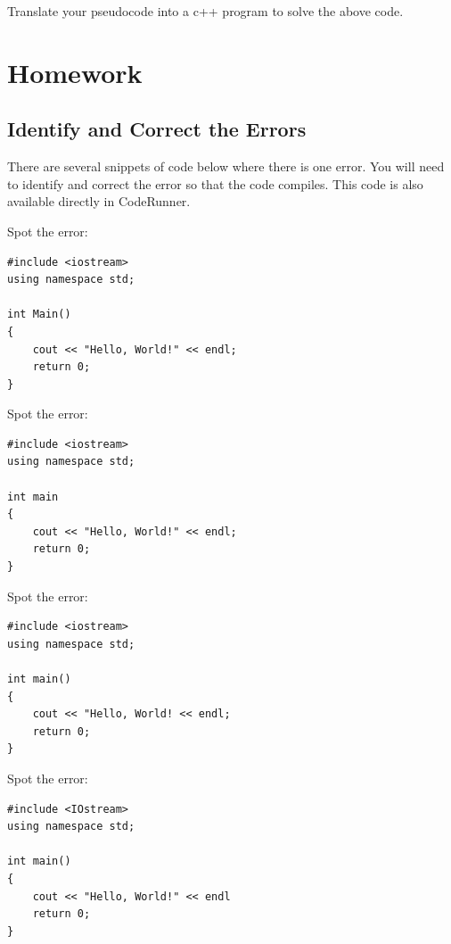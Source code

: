 \vspace{7cm}

\begin{multipart}
    Translate your pseudocode into a c++ program to solve the above code. 
\end{multipart}

\section{Homework}
\subsection{Identify and Correct the Errors}
There are several snippets of code below where there is one error. You will need to identify and correct the error so that the code compiles. This code is also available directly in CodeRunner. 

\begin{multipart}
Spot the error:

    \begin{verbatim}
#include <iostream> 
using namespace std;

int Main()
{
    cout << "Hello, World!" << endl;
    return 0; 
}
    \end{verbatim}
\end{multipart}

\begin{multipart}
Spot the error:

    \begin{verbatim}
#include <iostream> 
using namespace std;

int main 
{
    cout << "Hello, World!" << endl;
    return 0; 
}
    \end{verbatim}
\end{multipart}

\begin{multipart}
Spot the error:

    \begin{verbatim}
#include <iostream> 
using namespace std;

int main() 
{
    cout << "Hello, World! << endl;
    return 0; 
} 
    \end{verbatim}
\end{multipart}

\begin{multipart}
Spot the error:

    \begin{verbatim}
#include <IOstream> 
using namespace std;

int main() 
{
    cout << "Hello, World!" << endl
    return 0; 
} 
    \end{verbatim}
\end{multipart}


